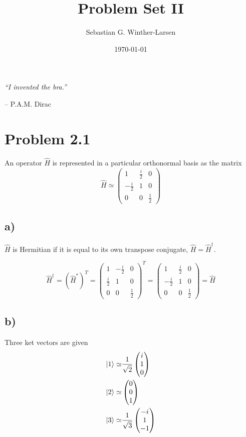 \documentclass{article}
\title{Problem Set II \\
  \hrulefill\fbox{\small{FYS3110}}\hrulefill}
\author{Sebastian G. Winther-Larsen}
\date{\today}
\newcommand*\colvec[3][]{
    \begin{pmatrix}\ifx\relax#1\relax\else#1\\\fi#2\\#3\end{pmatrix}
}
\begin{document}
\maketitle

\epigraph{\centering \large{\emph{``I invented the bra.''}}}{-- P.A.M. Dirac}


\section*{Problem 2.1}

An operator $\hat{H}$ is represented in a particular orthonormal basis
as the matrix
\begin{equation}
\hat{H}\simeq
\begin{pmatrix}
1 & \frac{i}{2} & 0 \\
-\frac{i}{2} & 1 & 0 \\
0 & 0 & \frac{1}{2}
\end{pmatrix}
\end{equation}

\subsection*{a)}

$\hat{H}$ is Hermitian if it is equal to its own transpose conjugate,
$\hat{H}=\hat{H}^{\dagger}$.

\begin{equation}
\hat{H}^{\dagger}=(\hat{H}^*)^T=
\begin{pmatrix}
1 & -\frac{i}{2} & 0 \\
\frac{i}{2} & 1 & 0 \\
0 & 0 & \frac{1}{2}
\end{pmatrix}^T=
\begin{pmatrix}
1 & \frac{i}{2} & 0 \\
-\frac{i}{2} & 1 & 0 \\
0 & 0 & \frac{1}{2}
\end{pmatrix}=
\hat{H}
\end{equation}

\subsection*{b)}

Three ket vectors are given 
\begin{align}
\ket{1} \simeq& \frac{1}{\sqrt{2}}\colvec[i]{1}{0}  \label{ket1}\\
\ket{2} \simeq& \colvec[0]{0}{1} \label{ket2}\\
\ket{3} \simeq& \frac{1}{\sqrt{3}}\colvec[-i]{1}{-1} \label{ket3}
\end{align}
\end{document}
